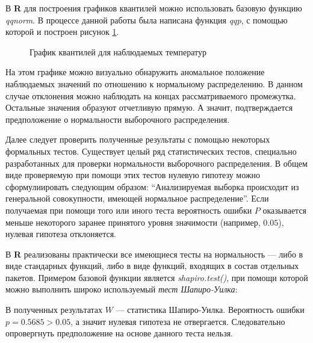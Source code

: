 В \textbf{R} для построения графиков квантилей можно использовать базовую функцию \textit{qqnorm}. В процессе данной работы была написана функция \textit{qqp}, с помощью которой и построен рисунок \ref{img:qqnorm}.
\begin{figure}[ht]
\caption{График квантилей для наблюдаемых температур}
\label{img:qqnorm}
\end{figure}
На этом графике можно визуально обнаружить аномальное положение наблюдаемых значений по отношению к нормальному распределению. В данном случае отклонения можно наблюдать на концах рассматриваемого промежутка. Остальные значения образуют отчетливую прямую. А значит, подтверждается предположение о нормальности выборочного распределения.

Далее следует проверить полученные результаты с помощью некоторых формальных тестов. Существует целый ряд статистических тестов, специально разработанных для проверки нормальности выборочного распределения. В общем виде проверяемую при помощи этих тестов нулевую гипотезу можно сформулиировать следующим образом: ``Анализируемая выборка происходит из генеральной совокупности, имеющей нормальное распределение''. Если получаемая при помощи того или иного теста вероятность ошибки $P$ оказывается меньше некоторого заранее принятого уровня значимости (например, $0.05$), нулевая гипотеза отклоняется.

В \textbf{R} реализованы практически все имеющиеся тесты на нормальность --- либо в виде стандарных функций, либо в виде функций, входящих в состав отдельных пакетов. Примером базовой функции является \textit{shapiro.test()}, при помощи которой можно выполнить широко используемый \textit{тест Шапиро-Уилка}:

В полученных результатах $W$ --- статистика Шапиро-Уилка. Вероятность ошибки $p = 0.5685 > 0.05$, а значит нулевая гипотеза не отвергается. Следовательно опровергнуть предположение на основе данного теста нельзя.

